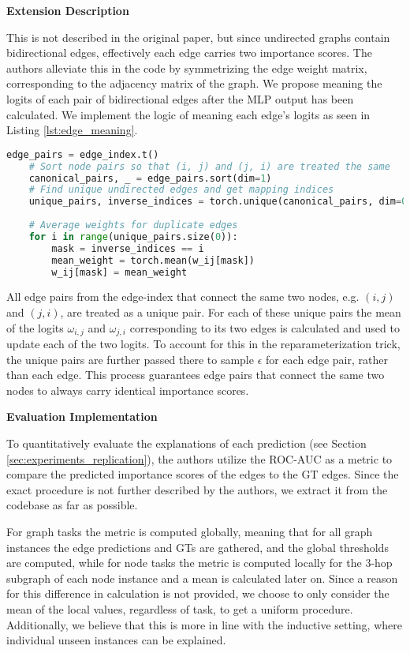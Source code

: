 \textbf{Extension Description}\par
This is not described in the original paper, but since undirected graphs contain bidirectional edges, effectively each edge carries two importance scores. The authors alleviate this in the code by symmetrizing the edge weight matrix, corresponding to the adjacency matrix of the graph. We propose meaning the logits of each pair of bidirectional edges after the MLP output has been calculated. We implement the logic of meaning each edge's logits as seen in Listing \ref{lst:edge_meaning}.
\begin{lstlisting}[language=Python, caption=Implementation of meaning bidirectional edge weights., label=lst:edge_meaning]
    edge_pairs = edge_index.t()
    # Sort node pairs so that (i, j) and (j, i) are treated the same
    canonical_pairs, _ = edge_pairs.sort(dim=1)
    # Find unique undirected edges and get mapping indices
    unique_pairs, inverse_indices = torch.unique(canonical_pairs, dim=0)
    
    # Average weights for duplicate edges
    for i in range(unique_pairs.size(0)):
        mask = inverse_indices == i
        mean_weight = torch.mean(w_ij[mask])
        w_ij[mask] = mean_weight
\end{lstlisting}
All edge pairs from the edge-index that connect the same two nodes, e.g. $(i,j)$ and $(j,i)$, are treated as a unique pair. For each of these unique pairs the mean of the logits $\omega_{i,j}$ and $\omega_{j,i}$ corresponding to its two edges is calculated and used to update each of the two logits. To account for this in the reparameterization trick, the unique pairs are further passed there to sample $\epsilon$ for each edge pair, rather than each edge. This process guarantees edge pairs that connect the same two nodes to always carry identical importance scores. \bigskip

\textbf{Evaluation Implementation}\par
To quantitatively evaluate the explanations of each prediction (see Section \ref{sec:experiments_replication}), the authors utilize the ROC-AUC as a metric to compare the predicted importance scores of the edges to the \ac{GT} edges. Since the exact procedure is not further described by the authors, we extract it from the codebase as far as possible.

For graph tasks the metric is computed globally, meaning that for all graph instances the edge predictions and \acp{GT} are gathered, and the global thresholds are computed, while for node tasks the metric is computed locally for the $3$-hop subgraph of each node instance and a mean is calculated later on.
Since a reason for this difference in calculation is not provided, we choose to only consider the mean of the local values, regardless of task, to get a uniform procedure. Additionally, we believe that this is more in line with the inductive setting, where individual unseen instances can be explained.

